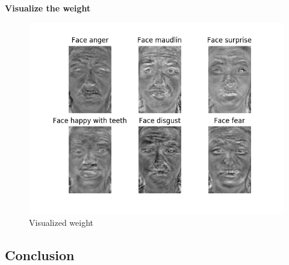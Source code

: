 \documentclass{article} %
\begin{document}
\begin{figure}[htb]
\end{figure}

\FloatBarrier
\newpage
\textbf{Visualize the weight}
\begin{figure}[htb]
    \includegraphics[width=\textwidth]{./Images/weight-visualization.png}
    \caption{Visualized weight}
\end{figure}

\subsection{Conclusion} 
\end{document}
